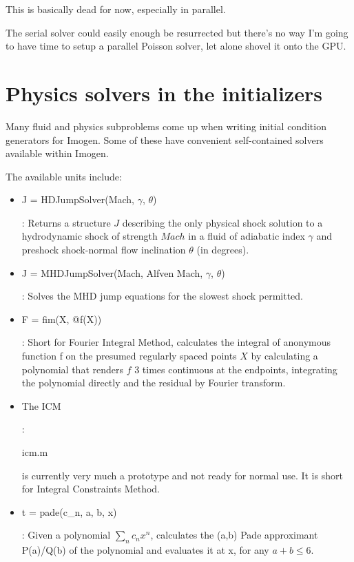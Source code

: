 \documentclass[letterpaper,12pt,twocolumn]{article}
\begin{document}
This is basically dead for now, especially in parallel.

The serial solver could easily enough be resurrected but there's no way I'm going
to have time to setup a parallel Poisson solver, let alone shovel it onto the GPU.

\section{Physics solvers in the initializers}

Many fluid and physics subproblems come up when writing initial condition generators
for Imogen. Some of these have convenient self-contained solvers available within
Imogen.

The available units include:
\begin{itemize}
\item \begin{tt}J = HDJumpSolver(Mach, $\gamma$, $\theta$)\end{tt}: Returns a structure $J$ describing the
only physical shock solution to a hydrodynamic shock of strength $Mach$ in a fluid of
adiabatic index $\gamma$ and preshock shock-normal flow inclination $\theta$ (in degrees).
\item \begin{tt}J = MHDJumpSolver(Mach, Alfven Mach, $\gamma$, $\theta$)\end{tt}: Solves the MHD jump
equations for the slowest shock permitted.
\item \begin{tt}F = fim(X, @f(X))\end{tt}: Short for Fourier Integral Method, calculates the integral of
anonymous function f on the presumed regularly spaced points $X$ by calculating a polynomial
that renders $f$ 3 times continuous at the endpoints, integrating the polynomial directly
and the residual by Fourier transform.
\item \begin{tt}The ICM\end{tt}: \begin{tt}icm.m\end{tt} is currently very much a prototype and not ready for normal use.
It is short for Integral Constraints Method.
\item \begin{tt}t = pade(c\_n, a, b, x)\end{tt}: Given a polynomial $\sum_n c_n x^n$, calculates the (a,b)
Pade approximant P(a)/Q(b) of the polynomial and evaluates it at x, for any $a+b \le 6$.

\end{itemize}
\end{document}
